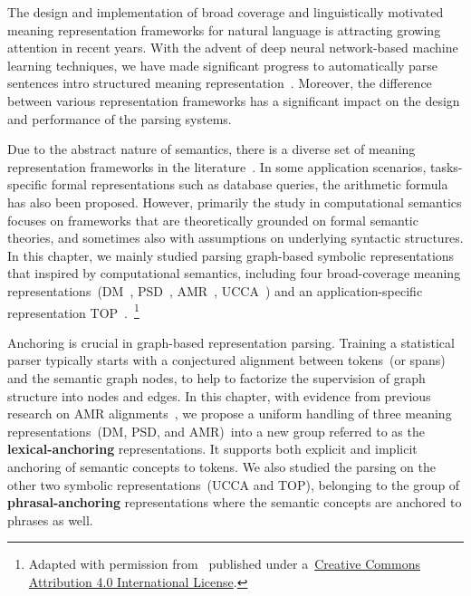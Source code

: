 The design and implementation of broad coverage and linguistically
motivated meaning representation frameworks for natural language is
attracting growing attention in recent years. With the advent of deep
neural network-based machine learning techniques, we have made
significant progress to automatically parse sentences intro structured
meaning
representation~\citep{Oep:Kuh:Miy:14,Oep:Kuh:Miy:15,May:2016wc,hershcovich-etal-2019-semeval}. Moreover,
the difference between various representation frameworks has a
significant impact on the design and performance of the parsing
systems.

Due to the abstract nature of semantics, there is a diverse set of
meaning representation frameworks in the
literature~\citep{abend2017state}. In some application scenarios,
tasks-specific formal representations such as database queries, the
arithmetic formula has also been proposed. However, primarily the
study in computational semantics focuses on frameworks that are
theoretically grounded on formal semantic theories, and sometimes also
with assumptions on underlying syntactic structures. In this chapter,
we mainly studied parsing graph-based symbolic representations that
inspired by computational semantics, including four broad-coverage
meaning representations~(DM~\citep{Iva:Oep:Ovr:12},
PSD~\citep{hajic2012announcing,miyao2014house},
AMR~\citet{Ban:Bon:Cai:13}, UCCA~\cite{Abe:Rap:13b}) and an
application-specific representation
TOP~\citep{gupta-etal-2018-semantic-parsing}.~\footnote{Adapted with
  permission from~\citet{cao2019amazon} published under
  a~\href{https://creativecommons.org/licenses/by/4.0/}{Creative
    Commons Attribution 4.0 International License}.}

Anchoring is crucial in graph-based representation parsing. Training a
statistical parser typically starts with a conjectured alignment
between tokens~(or spans) and the semantic graph nodes, to help to
factorize the supervision of graph structure into nodes and edges. In
this chapter, with evidence from previous research on AMR
alignments~\citep{Pourdamghani:2014aligning,Flanigan:2014vc,Wang:2017vt,chen2017unsupervised,szubert2018structured,lyu2018amr},
we propose a uniform handling of three meaning representations~(DM,
PSD, and AMR)~into a new group referred to as the
\textbf{lexical-anchoring} representations. It supports both explicit
and implicit anchoring of semantic concepts to tokens. We also studied
the parsing on the other two symbolic representations~(UCCA and TOP),
belonging to the group of \textbf{phrasal-anchoring} representations
where the semantic concepts are anchored to phrases as well.


